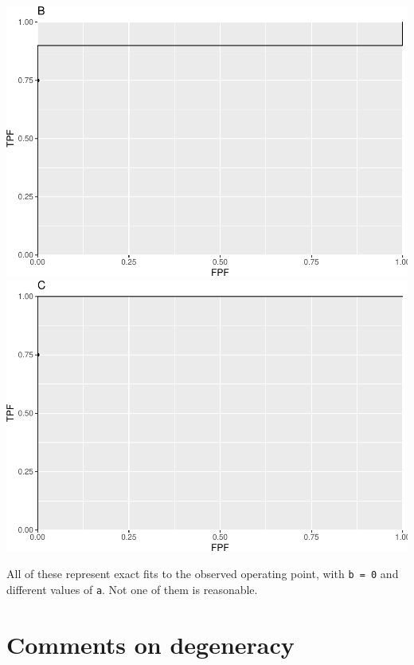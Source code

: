 \documentclass[
]{book}
\begin{document}
\includegraphics{22-DegenerateROCs_files/figure-latex/unnamed-chunk-3-1.pdf} \includegraphics{22-DegenerateROCs_files/figure-latex/unnamed-chunk-3-2.pdf}

All of these represent exact fits to the observed operating point, with \texttt{b\ =\ 0} and different values of \texttt{a}. Not one of them is reasonable.

\hypertarget{comments-on-degeneracy}{%
\section{Comments on degeneracy}\label{comments-on-degeneracy}}
\end{document}

